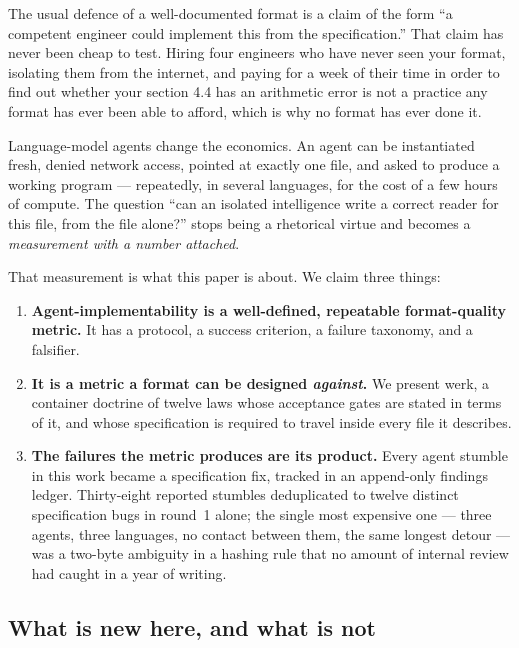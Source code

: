 \documentclass[10pt,twocolumn,letterpaper]{article}
\begin{document}
The usual defence of a well-documented format is a claim of the form ``a
competent engineer could implement this from the specification.'' That claim has
never been cheap to test. Hiring four engineers who have never seen your format,
isolating them from the internet, and paying for a week of their time in order to
find out whether your section 4.4 has an arithmetic error is not a practice any
format has ever been able to afford, which is why no format has ever done it.

Language-model agents change the economics. An agent can be instantiated fresh,
denied network access, pointed at exactly one file, and asked to produce a working
program --- repeatedly, in several languages, for the cost of a few hours of
compute. The question ``can an isolated intelligence write a correct reader for
this file, from the file alone?'' stops being a rhetorical virtue and becomes a
\emph{measurement with a number attached}.

That measurement is what this paper is about. We claim three things:

\begin{enumerate}[leftmargin=1.2em,itemsep=1pt,topsep=2pt]
\item \textbf{Agent-implementability is a well-defined, repeatable format-quality
metric.} It has a protocol, a success criterion, a failure taxonomy, and a
falsifier.
\item \textbf{It is a metric a format can be designed \emph{against}.} We present
werk, a container doctrine of twelve laws whose acceptance gates are stated in
terms of it, and whose specification is required to travel inside every file it
describes.
\item \textbf{The failures the metric produces are its product.} Every agent
stumble in this work became a specification fix, tracked in an append-only
findings ledger. Thirty-eight reported stumbles deduplicated to twelve distinct
specification bugs in round~1 alone; the single most expensive one --- three
agents, three languages, no contact between them, the same longest detour --- was
a two-byte ambiguity in a hashing rule that no amount of internal review had
caught in a year of writing.
\end{enumerate}

\subsection{What is new here, and what is not}
\end{document}
